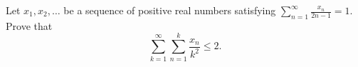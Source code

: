 Let \(x_1, x_2, \ldots\) be a sequence of positive real numbers satisfying \(\sum_{n=1}^{\infty}\frac{x_n}{2n-1}=1\).
Prove that \[ \sum_{k=1}^{\infty} \sum_{n=1}^{k} \frac{x_n}{k^2} \le2 . \]